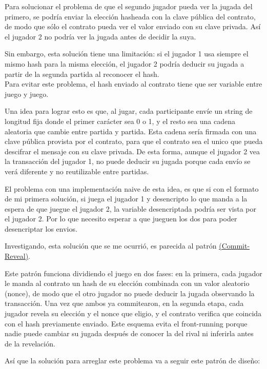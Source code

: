 \documentclass[12pt]{article}
\begin{document}
Para solucionar el problema de que el segundo jugador pueda ver la jugada del primero, se podría enviar la elección hasheada con la clave pública del contrato, de modo que sólo el contrato pueda ver el valor enviado con su clave privada. Así el jugador 2 no podría ver la jugada antes de decidir la suya.

Sin embargo, esta solución tiene una limitación: si el jugador 1 usa siempre el mismo hash para la misma elección, el jugador 2 podría deducir su jugada a partir de la segunda partida al reconocer el hash.\\
Para evitar este problema, el hash enviado al contrato tiene que ser variable entre juego y juego.

Una idea para lograr esto es que, al jugar, cada participante envíe un string de longitud fija donde el primer carácter sea 0 o 1, y el resto sea una cadena aleatoria que cambie entre partida y partida. Esta cadena sería firmada con una clave pública provista por el contrato, para que el contrato sea el unico que pueda descifrar el mensaje con su clave privada. 
De esta forma, aunque el jugador 2 vea la transacción del jugador 1, no puede deducir su jugada porque cada envío se verá diferente y no reutilizable entre partidas.

El problema con una implementación naive de esta idea, es que si con el formato de mi primera solución, si juega el jugador 1 y desencripto lo que manda a la espera de que juegue el jugador 2, la variable desencriptada podría ser vista por el jugador 2. Por lo que necesito esperar a que jueguen los dos para poder desencriptar los envios.

Investigando, esta solución que se me ocurrió, es parecida al patrón \href{https://medium.com/coinmonks/commit-reveal-scheme-in-solidity-c06eba4091bb}{(Commit-Reveal)}. 

Este patrón funciona dividiendo el juego en dos fases: en la primera, cada jugador le manda al contrato un hash de su elección combinada con un valor aleatorio (nonce), de modo que el otro jugador no puede deducir la jugada observando la transacción. Una vez que ambos ya commitearon, en la segunda etapa, cada jugador revela su elección y el nonce que eligio, y el contrato verifica que coincida con el hash previamente enviado. Este esquema evita el front-running porque nadie puede cambiar su jugada después de conocer la del rival ni inferirla antes de la revelación.

Así que la solución para arreglar este problema va a seguir este patrón de diseño:
\end{document}
